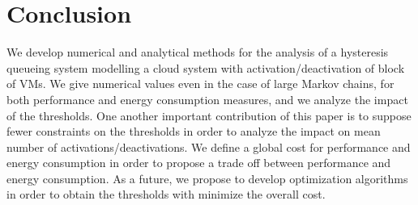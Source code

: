 \documentclass[conference]{IEEEtran}
\begin{document}
%
%

\section{Conclusion}

We develop numerical and analytical methods for the analysis of a hysteresis queueing system modelling a cloud system with activation/deactivation of block of VMs.
We give numerical values even in the case of large Markov chains, for both performance and energy consumption measures, and we analyze the impact of the thresholds.  One another important contribution of this paper  is to suppose fewer constraints on the thresholds in order to analyze the impact on  mean number of activations/deactivations.
We define a
global cost for performance and energy consumption in order to propose  a trade off between performance and energy consumption.
As a future,  we propose to develop optimization algorithms in order to obtain the thresholds with minimize
the overall cost.
\end{document}
